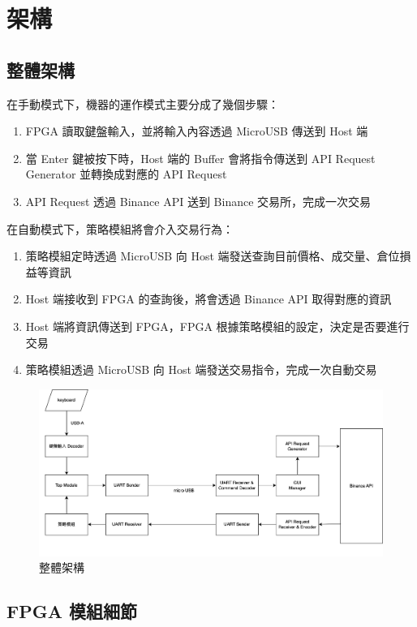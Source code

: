 \documentclass[10.5pt,compsoc,UTF8]{CjC}
\theoremstyle{mystyle}
\begin{document}
\section{架構}

\subsection{整體架構}

在手動模式下，機器的運作模式主要分成了幾個步驟：
\begin{enumerate}
  \item FPGA 讀取鍵盤輸入，並將輸入內容透過 MicroUSB 傳送到 Host 端
  \item 當 Enter 鍵被按下時，Host 端的 Buffer 會將指令傳送到 API Request Generator 並轉換成對應的 API Request
  \item API Request 透過 Binance API 送到 Binance 交易所，完成一次交易
\end{enumerate}

在自動模式下，策略模組將會介入交易行為：

\begin{enumerate}
  \item 策略模組定時透過 MicroUSB 向 Host 端發送查詢目前價格、成交量、倉位損益等資訊
  \item Host 端接收到 FPGA 的查詢後，將會透過 Binance API 取得對應的資訊
  \item Host 端將資訊傳送到 FPGA，FPGA 根據策略模組的設定，決定是否要進行交易
  \item 策略模組透過 MicroUSB 向 Host 端發送交易指令，完成一次自動交易
\end{enumerate}

\begin{figure}[H]
  \centering
  \includegraphics[width=\textwidth]{./img/arch.png}
  \caption{整體架構}
\end{figure}

\subsection{FPGA 模組細節}
\end{document}
